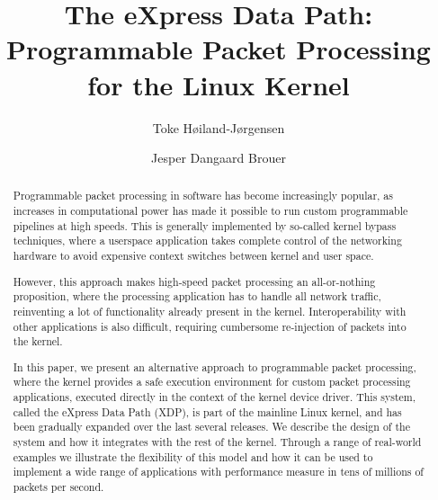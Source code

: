 \documentclass[10pt,sigconf]{acmart}
\begin{document}
\title{The eXpress Data Path: Programmable Packet Processing for the Linux Kernel}
\author{Toke Høiland-Jørgensen}

\author{Jesper Dangaard Brouer}

\renewcommand{\shorttitle}{The eXpress Data Path}
\captionsetup{font+=small}



\begin{abstract}
  Programmable packet processing in software has become increasingly popular, as
  increases in computational power has made it possible to run custom
  programmable pipelines at high speeds. This is generally implemented by
  so-called kernel bypass techniques, where a userspace application takes
  complete control of the networking hardware to avoid expensive context
  switches between kernel and user space.

  However, this approach makes high-speed packet processing an all-or-nothing
  proposition, where the processing application has to handle all network
  traffic, reinventing a lot of functionality already present in the kernel.
  Interoperability with other applications is also difficult, requiring
  cumbersome re-injection of packets into the kernel.

  In this paper, we present an alternative approach to programmable packet
  processing, where the kernel provides a safe execution environment for custom
  packet processing applications, executed directly in the context of the kernel
  device driver. This system, called the eXpress Data Path (XDP), is part of the
  mainline Linux kernel, and has been gradually expanded over the last several
  releases. We describe the design of the system and how it integrates with the
  rest of the kernel. Through a range of real-world examples we illustrate the
  flexibility of this model and how it can be used to implement a wide range of
  applications with performance measure in tens of millions of packets per
  second.
\end{abstract}


\maketitle
\end{document}
